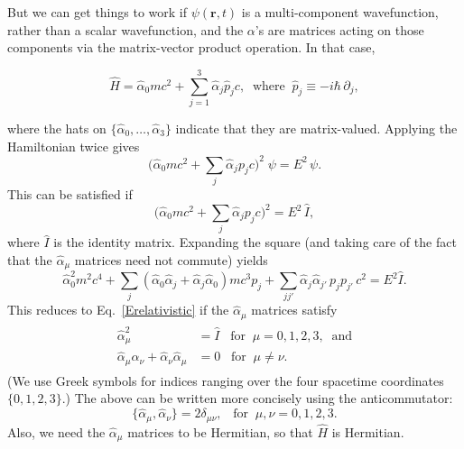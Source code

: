 \documentclass[prx,12pt]{revtex4-2}
\begin{document}
But we can get things to work if $\psi(\mathbf{r},t)$ is a
multi-component wavefunction, rather than a scalar wavefunction, and
the $\alpha$'s are matrices acting on those components via the
matrix-vector product operation.  In that case,
\begin{framed}
  \begin{equation}
    \hat{H} = \hat{\alpha}_0 mc^2 + \sum_{j=1}^3 \hat{\alpha}_j \hat{p}_j c,
    \;\; \mathrm{where}\;\; \hat{p}_j \equiv -i\hbar\, \partial_j,
    \label{Dirac}
  \end{equation}
\end{framed}
\vskip -0.05in
\noindent
where the hats on $\{\hat{\alpha}_0, \dots, \hat{\alpha}_3\}$ indicate
that they are matrix-valued.  Applying the Hamiltonian twice gives
\begin{equation}
  \Big(\hat{\alpha}_0mc^2 + \sum_{j}\hat{\alpha}_j p_j c\Big)^{\!2}\;
  \psi = E^2\,\psi.
\end{equation}
This can be satisfied if
\begin{equation}
  \Big(\hat{\alpha}_0 mc^2 + \sum_{j}\hat{\alpha}_j p_j c\Big)^2
  = E^2\, \hat{I},
\end{equation}
where $\hat{I}$ is the identity matrix.  Expanding the square (and
taking care of the fact that the $\hat{\alpha}_\mu$ matrices need not
commute) yields
\begin{equation}
  \hat{\alpha}_0^2 m^2c^4
  + \sum_j \left(\hat{\alpha}_0 \hat{\alpha}_j + \hat{\alpha}_j \hat{\alpha}_0\right) mc^3 p_j
  + \sum_{jj'} \hat{\alpha}_j \hat{\alpha}_{j'} \, p_j p_{j'} \,c^2 = E^2\hat{I}.
\end{equation}
This reduces to Eq.~\eqref{Erelativistic} if the $\hat{\alpha}_\mu$
matrices satisfy
\begin{align}
  \begin{aligned}
    \hat{\alpha}_\mu^2 &= \hat{I} \;\;\; \textrm{for} \;\;\mu=0,1,2,3,
    \;\;\textrm{and} \\
    \hat{\alpha}_\mu \hat{\alpha}_\nu
    + \hat{\alpha}_\nu \hat{\alpha}_\mu &= 0
    \;\;\; \textrm{for} \;\;\mu \ne \nu.
  \end{aligned}
\end{align}
(We use Greek symbols for indices ranging over the four spacetime
coordinates $\{0,1,2,3\}$.)  The above can be written more concisely
using the anticommutator:
\begin{equation}
  \{\hat{\alpha}_\mu, \hat{\alpha}_\nu\} = 2\delta_{\mu\nu},
  \;\;\; \textrm{for} \;\;\mu,\nu=0,1,2,3.
  \label{Dirac_anticomm}
\end{equation}
Also, we need the $\hat{\alpha}_\mu$ matrices to be Hermitian, so that
$\hat{H}$ is Hermitian.
\end{document}
